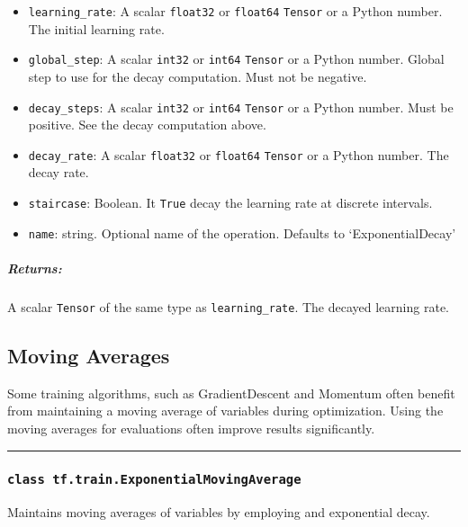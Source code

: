 \begin{itemize}
\tightlist
\item
  \texttt{learning\_rate}: A scalar \texttt{float32} or \texttt{float64}
  \texttt{Tensor} or a Python number. The initial learning rate.
\item
  \texttt{global\_step}: A scalar \texttt{int32} or \texttt{int64}
  \texttt{Tensor} or a Python number. Global step to use for the decay
  computation. Must not be negative.
\item
  \texttt{decay\_steps}: A scalar \texttt{int32} or \texttt{int64}
  \texttt{Tensor} or a Python number. Must be positive. See the decay
  computation above.
\item
  \texttt{decay\_rate}: A scalar \texttt{float32} or \texttt{float64}
  \texttt{Tensor} or a Python number. The decay rate.
\item
  \texttt{staircase}: Boolean. It \texttt{True} decay the learning rate
  at discrete intervals.
\item
  \texttt{name}: string. Optional name of the operation. Defaults to
  `ExponentialDecay'
\end{itemize}

\subparagraph{Returns: }\label{returns-12}

A scalar \texttt{Tensor} of the same type as \texttt{learning\_rate}.
The decayed learning rate.

\subsection{Moving Averages }\label{moving-averages}

Some training algorithms, such as GradientDescent and Momentum often
benefit from maintaining a moving average of variables during
optimization. Using the moving averages for evaluations often improve
results significantly.

\begin{center}\rule{0.5\linewidth}{\linethickness}\end{center}

\subsubsection{\texorpdfstring{\texttt{class\ tf.train.ExponentialMovingAverage}
}{class tf.train.ExponentialMovingAverage }}\label{class-tf.train.exponentialmovingaverage}

Maintains moving averages of variables by employing and exponential
decay.

